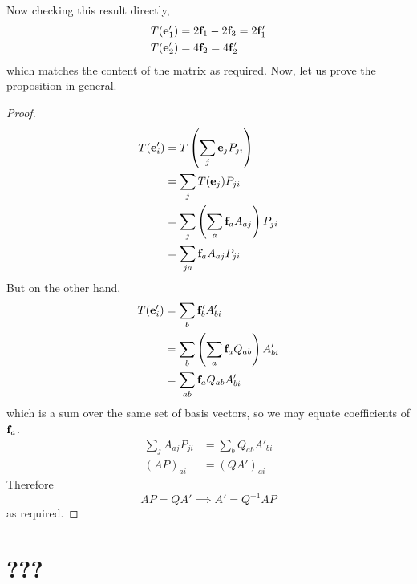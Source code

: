 \documentclass{article}
\begin{document}
Now checking this result directly,
\begin{align*}
	T(\vb e'_1) & = 2\vb f_1 - 2\vb f_3 = 2\vb f_1' \\
	T(\vb e'_2) & = 4\vb f_2 = 4\vb f_2'
\end{align*}
which matches the content of the matrix as required. Now, let us prove the proposition in general.
\begin{proof}
	\begin{align*}
		T(\vb e'_i) & = T\left( \sum_j \vb e_j P_{ji} \right)              \\
		            & = \sum_j T(\vb e_j) P_{ji}                           \\
		            & = \sum_j \left( \sum_a \vb f_a A_{aj} \right) P_{ji} \\
		            & = \sum_{ja} \vb f_a A_{aj} P_{ji}
	\end{align*}
	But on the other hand,
	\begin{align*}
		T(\vb e'_i) & = \sum_b \vb f'_b A'_{bi}                             \\
		            & = \sum_b \left( \sum_a \vb f_a Q_{ab} \right) A'_{bi} \\
		            & = \sum_{ab} \vb f_a Q_{ab} A'_{bi}
	\end{align*}
	which is a sum over the same set of basis vectors, so we may equate coefficients of $\vb f_a$.
	\begin{align*}
		\sum_j A_{aj} P_{ji} & = \sum_b Q_{ab} A'_{bi} \\
		(AP)_{ai}            & = (QA')_{ai}
	\end{align*}
	Therefore
	\[ AP = QA' \implies A' = Q^{-1}AP \]
	as required.
\end{proof}

\section{???}
\end{document}
